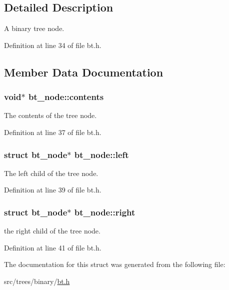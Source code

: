\subsection{Detailed Description}
A binary tree node. 

Definition at line 34 of file bt.h.



\subsection{Member Data Documentation}
\hypertarget{structbt__node_a9e0d7c8bb9ca7bb4b69bd4af9ca1440c}{
\subsubsection[{contents}]{\setlength{\rightskip}{0pt plus 5cm}void$\ast$ {\bf bt\_\-node::contents}}}
\label{structbt__node_a9e0d7c8bb9ca7bb4b69bd4af9ca1440c}


The contents of the tree node. 



Definition at line 37 of file bt.h.

\hypertarget{structbt__node_a689e6fb3fde56bc337d5234b0d7f8e80}{
\subsubsection[{left}]{\setlength{\rightskip}{0pt plus 5cm}struct {\bf bt\_\-node}$\ast$ {\bf bt\_\-node::left}}}
\label{structbt__node_a689e6fb3fde56bc337d5234b0d7f8e80}


The left child of the tree node. 



Definition at line 39 of file bt.h.

\hypertarget{structbt__node_aefe84db5b1f24953aba4743200b24898}{
\subsubsection[{right}]{\setlength{\rightskip}{0pt plus 5cm}struct {\bf bt\_\-node}$\ast$ {\bf bt\_\-node::right}}}
\label{structbt__node_aefe84db5b1f24953aba4743200b24898}


the right child of the tree node. 



Definition at line 41 of file bt.h.



The documentation for this struct was generated from the following file:\begin{DoxyCompactItemize}
\item 
src/trees/binary/\hyperlink{bt_8h}{bt.h}\end{DoxyCompactItemize}
